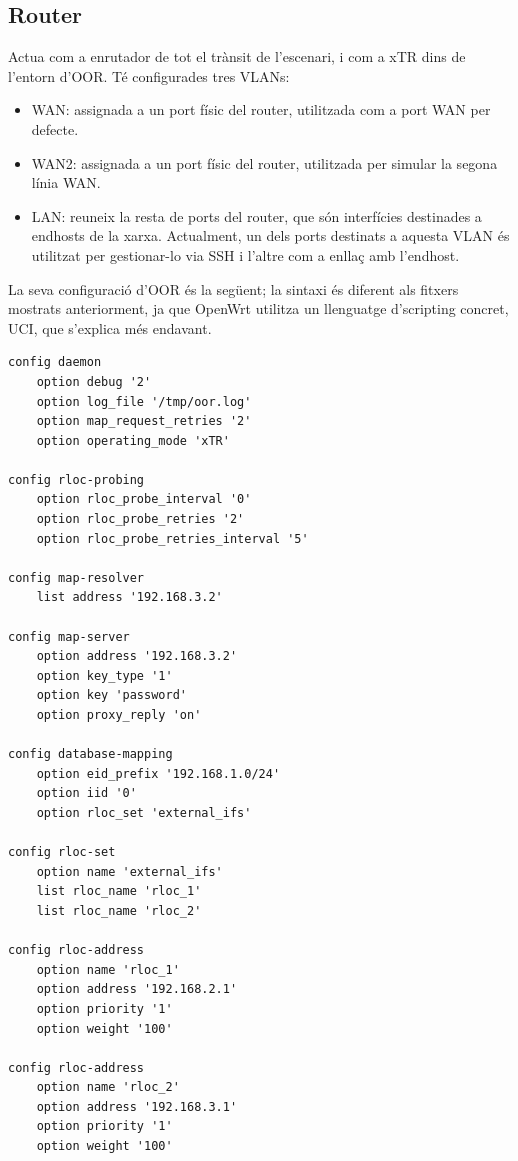 \documentclass[11pt]{article}
\begin{document}
\subsection{Router}
Actua com a enrutador de tot el trànsit de l’escenari, i com a xTR dins de l’entorn d’OOR. Té configurades tres VLANs:
\begin{itemize}
\item WAN: assignada a un port físic del router, utilitzada com a port WAN per defecte.
\item WAN2: assignada a un port físic del router, utilitzada per simular la segona línia WAN.
\item LAN: reuneix la resta de ports del router, que són interfícies destinades a endhosts de la xarxa. Actualment, un dels ports destinats a aquesta VLAN és utilitzat per gestionar-lo via SSH i l’altre com a enllaç amb l’endhost.
\end{itemize}
La seva configuració d’OOR és la següent; la sintaxi és diferent als fitxers mostrats anteriorment, ja que OpenWrt utilitza un llenguatge d’scripting concret, UCI, que s’explica més endavant.\\
\lstset{language=sh, caption=Configuració d'OOR de l'xTR}
\begin{lstlisting}[frame=single]
config daemon
    option debug '2'
    option log_file '/tmp/oor.log'
    option map_request_retries '2'
    option operating_mode 'xTR'

config rloc-probing
    option rloc_probe_interval '0'
    option rloc_probe_retries '2'
    option rloc_probe_retries_interval '5'

config map-resolver
    list address '192.168.3.2'

config map-server
    option address '192.168.3.2'
    option key_type '1'
    option key 'password'
    option proxy_reply 'on'

config database-mapping
    option eid_prefix '192.168.1.0/24'
    option iid '0'
    option rloc_set 'external_ifs'

config rloc-set
    option name 'external_ifs'
    list rloc_name 'rloc_1'
    list rloc_name 'rloc_2'

config rloc-address
    option name 'rloc_1'
    option address '192.168.2.1'
    option priority '1'
    option weight '100'

config rloc-address
    option name 'rloc_2'
    option address '192.168.3.1'
    option priority '1'
    option weight '100'
\end{lstlisting}
\end{document}
